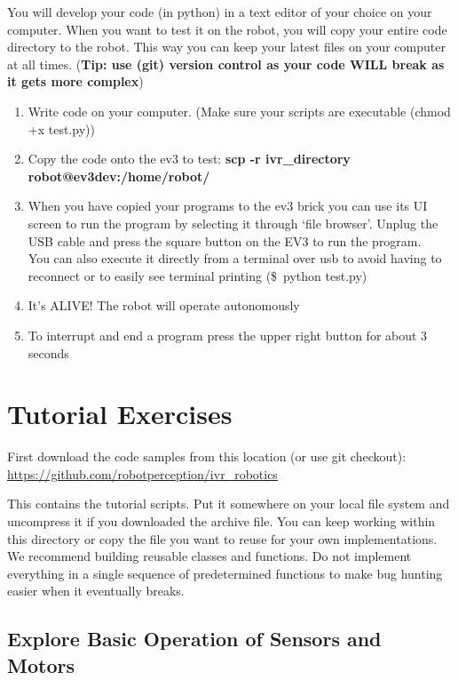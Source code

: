 \documentclass{article}
\begin{document}
  You will develop your code (in python) in a text editor of your choice on your computer. When 
  you want to test it on the robot, you will copy your entire code directory to the robot. This way 
  you can keep your latest files on your computer at all times. (\textbf{Tip: use (git) version control as your code WILL break as it gets more complex})
  \begin{enumerate}
      \item Write code on your computer. (Make sure your scripts are executable (chmod +x test.py))
      \item Copy the code onto the ev3 to test: \textbf{scp -r ivr\_directory robot@ev3dev:/home/robot/}
      \item When you have copied your programs to the ev3 brick you can use its UI screen to run
  the program by selecting it through ‘file browser’. Unplug the USB cable and press the 
  square button on the EV3 to run the program. \\ 
  You can also execute it directly from a terminal over usb to avoid having to 
  reconnect or to easily see terminal printing (\$~python test.py)

  \item It’s ALIVE! The robot will operate autonomously
  \item To interrupt and end a program press the upper right button for about 3 seconds

  \end{enumerate}



  \section{Tutorial Exercises}

  First download the code samples from this location (or use git checkout):\\
  \url{https://github.com/robotperception/ivr\_robotics}

  This contains the tutorial scripts. Put it somewhere on your local file system
  and uncompress it if you downloaded the archive file. You can keep working within
  this directory or copy the file you want to reuse for your own implementations.
  We recommend building reusable classes and functions. Do not implement everything 
  in a single sequence of predetermined functions to make bug hunting easier when it 
  eventually breaks. 
  
  \subsection{Explore Basic Operation of Sensors and Motors}
\end{document}
